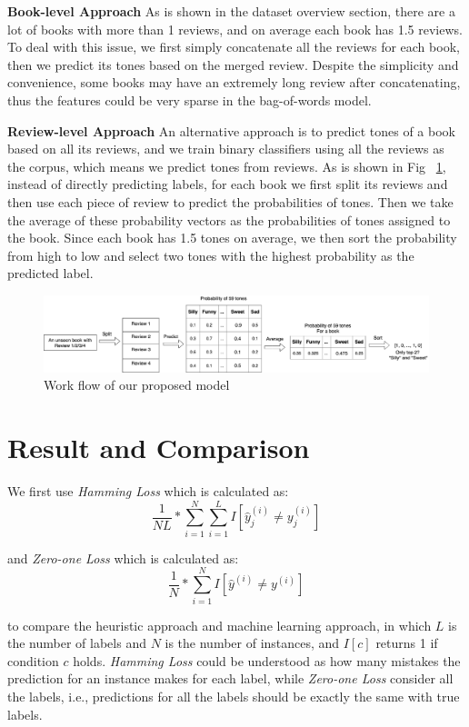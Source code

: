 \documentclass[runningheads]{llncs}
\begin{document}
\textbf{Book-level Approach} As is shown in the dataset overview section, there are a lot of books with more than 1 reviews, and on average each book has 1.5 reviews. To deal with this issue, we first simply concatenate all the reviews for each book, then we predict its tones based on the merged review. Despite the simplicity and convenience, some books may have an extremely long review after concatenating, thus the features could be very sparse in the bag-of-words model.

\textbf{Review-level Approach} An alternative approach is to predict tones of a book based on all its reviews, and we train binary classifiers using all the reviews as the corpus, which means we predict tones from reviews. As is shown in Fig ~\ref{fig3}, instead of directly predicting labels, for each book we first split its reviews and then use each piece of review to predict the probabilities of tones. Then we take the average of these probability vectors as the probabilities of tones assigned to the book. Since each book has 1.5 tones on average, we then sort the probability from high to low and select two tones with the highest probability as the predicted label.

\begin{figure}
\includegraphics[width=\textwidth]{s3.eps}
\caption{Work flow of our proposed model} 
\label{fig3}
\end{figure}

\section{Result and Comparison}

We first use \emph{Hamming Loss} which is calculated as:
\begin{equation}
\frac{1}{NL} * \sum _{i=1}^{N} \sum _{i=1}^{L} I [\hat{y}^{(i)}_{j} \ne y^{(i)}_{j}]
\end{equation}

\noindent and \emph{Zero-one Loss} which is calculated as:
\begin{equation}
\frac{1}{N} * \sum _{i=1}^{N} I [\hat{y}^{(i)} \ne y^{(i)}]
\end{equation}

\noindent to compare the heuristic approach and machine learning approach, in which $L$ is the number of labels and $N$ is the number of instances, and $I[c]$ returns 1 if condition $c$ holds. \emph{Hamming Loss} could be understood as how many mistakes the prediction for an instance makes for each label, while \emph{Zero-one Loss} consider all the labels, i.e., predictions for all the labels should be exactly the same with true labels. 
\end{document}
